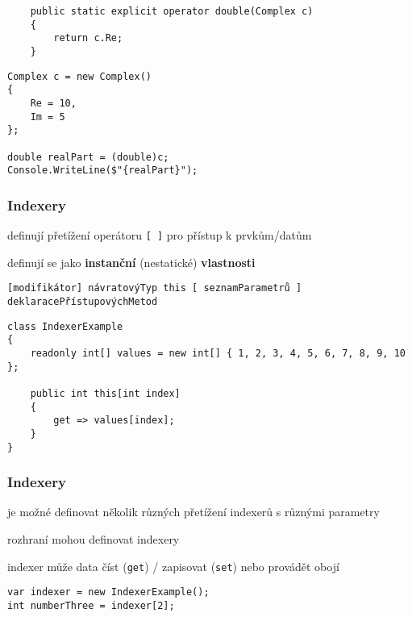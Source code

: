 \begin{frame}[fragile]
\vfill
\begin{yesblock}
\begin{lstlisting}
    public static explicit operator double(Complex c)
    {
        return c.Re;
    }
\end{lstlisting}
\end{yesblock}
\vfill
\begin{yesblock}
\begin{lstlisting}
Complex c = new Complex()
{
    Re = 10,
    Im = 5
};

double realPart = (double)c;
Console.WriteLine($"{realPart}");
\end{lstlisting}
\end{yesblock}
\vfill
\end{frame}






\zkouskove

\begin{frame}[fragile]
\frametitle{Indexery}
\vfill
\begin{bitemize}{}
\item definují přetížení operátoru \lstinline|[ ]| pro přístup k prvkům/datům
\item definují se jako \textbf{instanční} (nestatické) \textbf{vlastnosti}
\end{bitemize}
\vfill
\begin{noteblock}{}
\begin{lstlisting}
[modifikátor] návratovýTyp this [ seznamParametrů ] deklaracePřístupovýchMetod
\end{lstlisting}
\end{noteblock}
\vfill
\begin{yesblock}
\begin{lstlisting}
class IndexerExample
{
    readonly int[] values = new int[] { 1, 2, 3, 4, 5, 6, 7, 8, 9, 10 };

    public int this[int index]
    {
        get => values[index];
    }
}
\end{lstlisting}
\end{yesblock}
\vfill
\end{frame}


\begin{frame}[fragile]
\frametitle{Indexery}
\vfill
\begin{bitemize}{}
\item je možné definovat několik různých přetížení indexerů s různými parametry
\item rozhraní mohou definovat indexery
\item indexer může data číst (\lstinline|get|) / zapisovat (\lstinline|set|) nebo provádět obojí
\end{bitemize}
\vfill
\begin{yesblock}
\begin{lstlisting}
var indexer = new IndexerExample();
int numberThree = indexer[2];
\end{lstlisting}
\end{yesblock}
\vfill
\end{frame}



